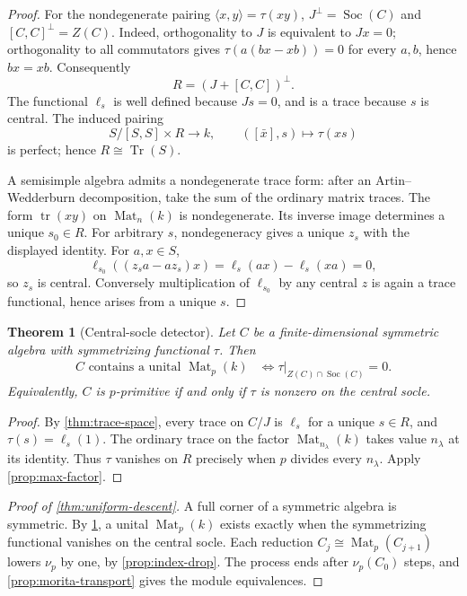 \documentclass[11pt,reqno]{amsart}
\newtheorem{theorem}{Theorem}[section]
\theoremstyle{definition}
\theoremstyle{remark}
\theoremstyle{definition}
\newcommand{\Mat}{\operatorname{Mat}}
\newcommand{\Soc}{\operatorname{Soc}}
\newcommand{\Tr}{\operatorname{Tr}}
\newcommand{\nuP}{\nu_p}
\begin{document}
\begin{proof}
For the nondegenerate pairing $\langle x,y\rangle=\tau(xy)$,
$J^\perp=\Soc(C)$ and $[C,C]^\perp=Z(C)$.
Indeed, orthogonality to $J$ is equivalent to $Jx=0$;
orthogonality to all commutators gives
$\tau(a(bx-xb))=0$ for every $a,b$, hence $bx=xb$.
Consequently
\[
 R=(J+[C,C])^\perp.
\]
The functional $\ell_s$ is well defined because $Js=0$, and is a trace
because $s$ is central. The induced pairing
\[
 S/[S,S]\times R\to k,
 \qquad ([\bar x],s)\mapsto\tau(xs)
\]
is perfect; hence $R\cong\Tr(S)$.

A semisimple algebra admits a nondegenerate trace form: after an
Artin--Wedderburn decomposition, take the sum of the ordinary matrix traces.
The form $\operatorname{tr}(xy)$ on $\Mat_n(k)$ is nondegenerate.
Its inverse image determines a unique $s_0\in R$.  For arbitrary $s$,
nondegeneracy gives a unique $z_s$
with the displayed identity.  For $a,x\in S$,
\[
 \ell_{s_0}((z_sa-az_s)x)
 =\ell_s(ax)-\ell_s(xa)=0,
\]
so $z_s$ is central.  Conversely multiplication of $\ell_{s_0}$ by any
central $z$ is again a trace functional, hence arises from a unique $s$.
\end{proof}

\begin{theorem}[Central-socle detector]\label{thm:central-socle-detector}
Let $C$ be a finite-dimensional symmetric algebra with symmetrizing
functional $\tau$.  Then
\begin{align*}
 C\text{ contains a unital }\Mat_p(k)
 &\Longleftrightarrow
 \tau|_{Z(C)\cap\Soc(C)}=0.
\end{align*}
Equivalently, $C$ is $p$-primitive if and only if
$\tau$ is nonzero on the central socle.
\end{theorem}

\begin{proof}
By \cref{thm:trace-space}, every trace on $C/J$ is $\ell_s$ for a
unique $s\in R$, and $\tau(s)=\ell_s(1)$.
The ordinary trace on the factor $\Mat_{n_\lambda}(k)$ takes value
$n_\lambda$ at its identity. Thus $\tau$ vanishes on $R$ precisely
when $p$ divides every $n_\lambda$. Apply \cref{prop:max-factor}.
\end{proof}

\begin{proof}[Proof of \cref{thm:uniform-descent}]
A full corner of a symmetric algebra is symmetric.
By \cref{thm:central-socle-detector}, a unital $\Mat_p(k)$ exists
exactly when the symmetrizing functional vanishes on the central socle.
Each reduction $C_j\cong\Mat_p(C_{j+1})$ lowers $\nuP$ by one,
by \cref{prop:index-drop}. The process ends after $\nuP(C_0)$ steps,
and \cref{prop:morita-transport} gives the module equivalences.
\end{proof}
\end{document}
